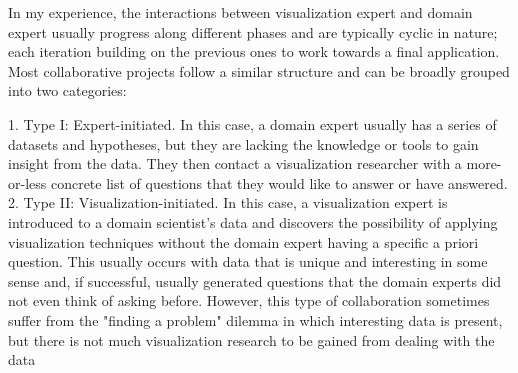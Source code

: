 In my experience, the interactions between visualization expert and domain expert usually progress along different phases and are typically cyclic in nature; each iteration building on the previous ones to work towards a final application. Most collaborative projects follow a similar structure and can be broadly grouped into two categories:

1. Type I: Expert-initiated. In this case, a domain expert usually has a series of datasets and hypotheses, but they are lacking the knowledge or tools to gain insight from the data. They then contact a visualization researcher with a more-or-less concrete list of questions that they would like to answer or have answered.
2. Type II: Visualization-initiated. In this case, a visualization expert is introduced to a domain scientist's data and discovers the possibility of applying visualization techniques without the domain expert having a specific a priori question. This usually occurs with data that is unique and interesting in some sense and, if successful, usually generated questions that the domain experts did not even think of asking before. However, this type of collaboration sometimes suffer from the "finding a problem" dilemma in which interesting data is present, but there is not much visualization research to be gained from dealing with the data

